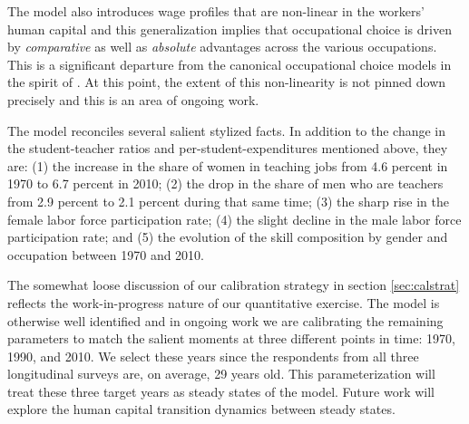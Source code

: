 \documentclass[onehalfspacing,11pt]{article}
\begin{document}
	The model also introduces wage profiles that are non-linear in the workers' human capital and this generalization implies that occupational choice is driven by {\it comparative} as well as {\it absolute} advantages across the various occupations. This is a significant departure from the canonical occupational choice models in the spirit of \cite{Roy:1951}. At this point, the extent of this non-linearity is not pinned down precisely and this is an area of ongoing work.
	
	The model reconciles several salient stylized facts. In addition to the change in the student-teacher ratios and per-student-expenditures mentioned above, they are: (1) the increase in the share of women in teaching jobs from 4.6 percent in 1970 to 6.7 percent in 2010; (2) the drop in the share of men who are teachers from 2.9 percent to 2.1 percent during that same time; (3) the sharp rise in the female labor force participation rate; (4) the slight decline in the male labor force participation rate; and (5) the evolution of the skill composition by gender and occupation between 1970 and 2010.
	
	The somewhat loose discussion of our calibration strategy in section \ref{sec:calstrat} reflects the work-in-progress nature of our quantitative exercise. The model is otherwise well identified and in ongoing work we are calibrating the remaining parameters to match the salient moments at three different points in time: 1970, 1990, and 2010. We select these years since the respondents from all three longitudinal surveys are, on average, 29 years old. This parameterization will treat these three target years as steady states of the model. Future work will explore the human capital transition dynamics between steady states.
	
	
	\newpage
	
	
	
	\newpage
	\appendix
\end{document}
